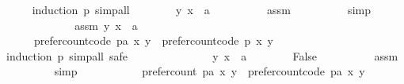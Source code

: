 \begin{isabellebody}
\ \ \ \ \isamarkupfalse%
\ {\isacharparenleft}{\kern0pt}induction\ p{\isacharcomma}{\kern0pt}\ simp{\isacharunderscore}{\kern0pt}all{\isacharparenright}{\kern0pt}\isanewline
\ \ \ \ \ \ \isamarkupfalse%
\ {\isachardoublequoteopen}{\isacharparenleft}{\kern0pt}y{\isacharcomma}{\kern0pt}\ x{\isacharparenright}{\kern0pt}\ {\isasymin}\ a{\isachardoublequoteclose}\isanewline
\ \ \ \ \ \ \ \ \isamarkupfalse%
\ assm\isanewline
\ \ \ \ \ \ \ \ \isamarkupfalse%
\ simp\isanewline
\ \ \ \ \isamarkupfalse%
\isanewline
\ \ \isamarkupfalse%
\isanewline
\ \ \ \ \isamarkupfalse%
\isanewline
\ \ \ \ \ \ assm{\isacharcolon}{\kern0pt}\ {\isachardoublequoteopen}{\isacharparenleft}{\kern0pt}y{\isacharcomma}{\kern0pt}\ x{\isacharparenright}{\kern0pt}\ {\isasymnotin}\ a{\isachardoublequoteclose}\isanewline
\ \ \ \ \isamarkupfalse%
\isanewline
\ \ \ \ \ \ {\isachardoublequoteopen}prefer{\isacharunderscore}{\kern0pt}count{\isacharunderscore}{\kern0pt}code\ {\isacharparenleft}{\kern0pt}p{\isacharat}{\kern0pt}{\isacharbrackleft}{\kern0pt}a{\isacharbrackright}{\kern0pt}{\isacharparenright}{\kern0pt}\ x\ y\ {\isacharequal}{\kern0pt}\ prefer{\isacharunderscore}{\kern0pt}count{\isacharunderscore}{\kern0pt}code\ p\ x\ y{\isachardoublequoteclose}\isanewline
\ \ \ \ \isamarkupfalse%
\ {\isacharparenleft}{\kern0pt}induction\ p{\isacharcomma}{\kern0pt}\ simp{\isacharunderscore}{\kern0pt}all{\isacharcomma}{\kern0pt}\ safe{\isacharparenright}{\kern0pt}\isanewline
\ \ \ \ \ \ \isamarkupfalse%
\isanewline
\ \ \ \ \ \ \ \ {\isachardoublequoteopen}{\isacharparenleft}{\kern0pt}y{\isacharcomma}{\kern0pt}\ x{\isacharparenright}{\kern0pt}\ {\isasymin}\ a{\isachardoublequoteclose}\isanewline
\ \ \ \ \ \ \isamarkupfalse%
\ {\isachardoublequoteopen}False{\isachardoublequoteclose}\isanewline
\ \ \ \ \ \ \ \ \isamarkupfalse%
\ assm\isanewline
\ \ \ \ \ \ \ \ \isamarkupfalse%
\ simp\isanewline
\ \ \ \ \isamarkupfalse%
\isanewline
\ \ \isamarkupfalse%
\isanewline
\ \ \isamarkupfalse%
\ {\isachardoublequoteopen}prefer{\isacharunderscore}{\kern0pt}count\ {\isacharparenleft}{\kern0pt}p{\isacharat}{\kern0pt}{\isacharbrackleft}{\kern0pt}a{\isacharbrackright}{\kern0pt}{\isacharparenright}{\kern0pt}\ x\ y\ {\isacharequal}{\kern0pt}\ prefer{\isacharunderscore}{\kern0pt}count{\isacharunderscore}{\kern0pt}code\ {\isacharparenleft}{\kern0pt}p{\isacharat}{\kern0pt}{\isacharbrackleft}{\kern0pt}a{\isacharbrackright}{\kern0pt}{\isacharparenright}{\kern0pt}\ x\ y{\isachardoublequoteclose}\isanewline

\end{isabellebody}
